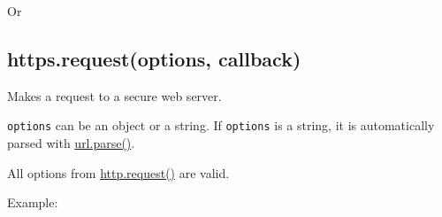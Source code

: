 Or

\begin{Shaded}
\begin{Highlighting}[]
 \NormalTok{);}
 \NormalTok{);}

 
  \NormalTok{: }\NormalTok{(}\NormalTok{)}
\NormalTok{\};}

 
  \NormalTok{(}\NormalTok{);}
  \NormalTok{(}\NormalTok{);}
\NormalTok{(}\NormalTok{);}
\end{Highlighting}
\end{Shaded}

\subsection{https.request(options, callback)}

Makes a request to a secure web server.

\texttt{options} can be an object or a string. If \texttt{options} is a
string, it is automatically parsed with
\href{url.html\#url.parse}{url.parse()}.

All options from
\href{http.html\#http\_http\_request\_options\_callback}{http.request()}
are valid.

Example:

